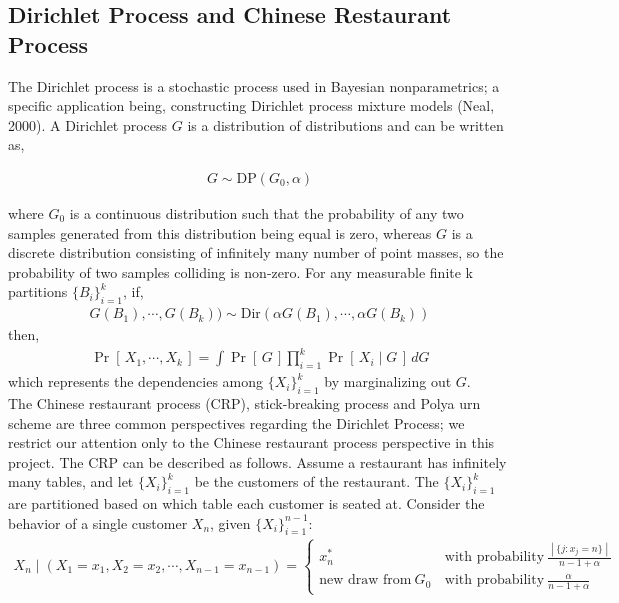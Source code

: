 \documentclass{article}
\newcommand{\prob}[1]{\operatorname{Pr}\left[\,#1\,\right]}
\def\cond{\; | \;}
\begin{document}
\subsection{Dirichlet Process and Chinese Restaurant Process}

The Dirichlet process is a stochastic process used in Bayesian nonparametrics; a specific application being, constructing Dirichlet process mixture models (Neal, 2000). A Dirichlet process $G$ is a distribution of distributions and can be written as,

\begin{align*}
G \sim \text{DP}(G_0, \alpha)
\end{align*}

where $G_0$ is a continuous distribution such that the probability of any two samples generated from this distribution being equal is zero, whereas $G$ is a discrete distribution consisting of infinitely many number of point masses,  so the probability of two samples colliding is non-zero.  For any measurable finite k partitions $\{B_i\}_{i=1}^k$, if,
\begin{align*}
G(B_1), \cdots, G(B_k))\sim \text{Dir}(\alpha G(B_1), \cdots, \alpha G(B_k))
\end{align*}
then,
\begin{align*}
\prob{X_1, \cdots, X_k} = \int \prob{G} \prod_{i=1}^k \prob{X_i\cond G}\,dG
\end{align*}
which represents the dependencies among $\{X_i\}_{i=1}^k$ by marginalizing out $G$. \\

The Chinese restaurant process (CRP), stick-breaking process and Polya urn scheme are three common perspectives regarding the Dirichlet Process; we restrict our attention only to the Chinese restaurant process perspective in this project. The CRP can be described as follows. Assume a restaurant has infinitely many tables,  and let $\{X_i\}_{i=1}^k$ be the customers of the restaurant.  The $\{X_i\}_{i=1}^k$ are partitioned based on which table each customer is seated at.  Consider the behavior of a single customer $X_n$, given $\{X_i\}_{i=1}^{n-1}$:
\begin{align*}
X_n\cond (X_1 = x_1, X_2 = x_2, \cdots,  X_{n-1} = x_{n-1}) = \left\{
\begin{array}{rl}
x_n^* \, &\text{with probability}\ \frac{\cond\{j : x_j = n\}\cond}{n - 1 + \alpha}\\
\text{new draw from}\ G_0\, &\text{with probability}\  \frac{\alpha}{n - 1 + \alpha}
\end{array}
\right.
\end{align*}
\end{document}
